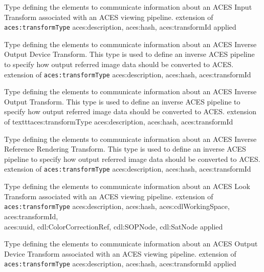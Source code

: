                 {Type defining the elements to communicate information about an ACES Input Transform associated with an ACES viewing pipeline.}
                {extension of \texttt{aces:transformType}}
                {aces:description, aces:hash, aces:transformId}
                {applied}
                
                {Type defining the elements to communicate information about an ACES Inverse Output Device Transform.  This type is used to define an inverse ACES pipeline to specify how output referred image data should be converted to ACES.}
                {extension of \texttt{aces:transformType}}
                {aces:description, aces:hash, aces:transformId}
                
                {Type defining the elements to communicate information about an ACES Inverse Output Transform. This type is used to define an inverse ACES pipeline to specify how output referred image data should be converted to ACES.}
                {extension of texttt{aces:transformType}}
                {aces:description, aces:hash, aces:transformId}

                {Type defining the elements to communicate information about an ACES Inverse Reference Rendering Transform.  This type is used to define an inverse ACES pipeline to specify how output referred image data should be converted to ACES.}
                {extension of \texttt{aces:transformType}}
                {aces:description, aces:hash, aces:transformId}

                {Type defining the elements to communicate information about an ACES Look Transform associated with an ACES viewing pipeline.}
                {extension of \texttt{aces:transformType}}
                {aces:description, aces:hash, aces:cdlWorkingSpace, aces:transformId,\\ aces:uuid, cdl:ColorCorrectionRef, cdl:SOPNode, cdl:SatNode}
                {applied}
                
                {Type defining the elements to communicate information about an ACES Output Device Transform associated with an ACES viewing pipeline.}
                {extension of \texttt{aces:transformType}}
                {aces:description, aces:hash, aces:transformId}
                {applied}


